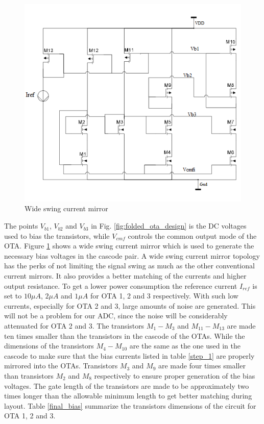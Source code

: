 \begin{figure}[h!]
\centering
\includegraphics[scale = 0.7]{images/bias_circuit.png}
\caption{Wide swing current mirror}
\label{bias circuit}
\end{figure}

The points $V_{b1}$, $V_{b2}$ and $V_{b3}$ in Fig. \ref{fig:folded_ota_design} is the DC voltages used to bias the transistors, while $V_{cmf}$ controls the common output mode of the OTA. Figure \ref{bias circuit} shows a wide swing current mirror \cite{Allen} which is used to generate the necessary bias voltages in the cascode pair. A wide swing current mirror topology has the perks of not limiting the signal swing as much as the other conventional current mirrors. It also provides a better matching of the currents and higher output resistance. To get a lower power consumption the reference current $I_{ref}$ is set to $10\mu A$, $2\mu A$ and $1\mu A$ for OTA 1, 2 and 3 respectively. With such low currents, especially for OTA 2 and 3, large amounts of noise are generated. This will not be a problem for our ADC, since the noise will be considerably attenuated for OTA 2 and 3. The transistors $M_1-M_3$ and $M_{11}-M_{13}$ are made ten times smaller than the transistors in the cascode of the OTAs. While the dimensions of the transistors $M_{4} - M_{10}$ are the same as the one used in the cascode to make sure that the bias currents listed in table \ref{step_1} are properly mirrored into the OTAs. Transistors $M_3$ and $M_9$ are made four times smaller than transistors $M_2$ and $M_8$ respectively to ensure proper generation of the bias voltages\cite{Johns}. The gate length of the transistors are made to be approximately two times longer than the allowable minimum length to get better matching during layout. Table \ref{final_bias} summarize the transistors dimensions of the circuit for OTA 1, 2 and 3.    

